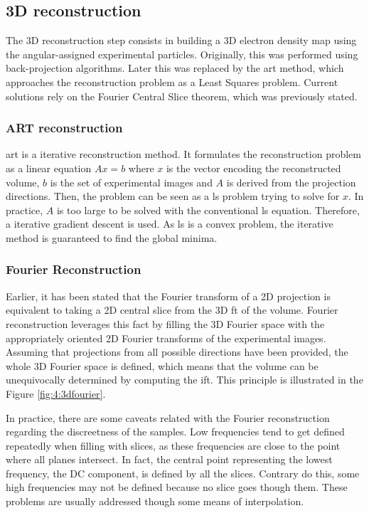 \documentclass[../main.tex]{subfiles}
\begin{document}
\subsection{3D reconstruction}
The 3D reconstruction step consists in building a 3D electron density map using the angular-assigned experimental particles. Originally, this was performed using back-projection algorithms. Later this was replaced by the \gls{art} method, which approaches the reconstruction problem as a Least Squares problem. Current solutions rely on the Fourier Central Slice theorem, which was previously stated.

\subsubsection{ART reconstruction}
\Gls{art} is a iterative reconstruction method. It formulates the reconstruction problem as a linear equation $Ax = b$ where $x$ is the vector encoding the reconstructed volume, $b$ is the set of experimental images and $A$ is derived from the projection directions. Then, the problem can be seen as a \gls{ls} problem\cite{kak2001} trying to solve for $x$. In practice, $A$ is too large to be solved with the conventional \gls{ls} equation. Therefore, a iterative gradient descent is used. As \gls{ls} is a convex problem, the iterative method is guaranteed to find the global minima\cite{nikazad2008}\cite{sorzano2017b}.

\subsubsection{Fourier Reconstruction}
Earlier, it has been stated that the Fourier transform of a 2D projection is equivalent to taking a 2D central slice from the 3D \gls{ft} of the volume. Fourier reconstruction leverages this fact by filling the 3D Fourier space with the appropriately oriented 2D Fourier transforms of the experimental images. Assuming that projections from all possible directions have been provided, the whole 3D Fourier space is defined, which means that the volume can be unequivocally determined by computing the \gls{ift}. This principle is illustrated in the Figure \ref{fig:4:3dfourier}\cite{sorzano2017b}.

In practice, there are some caveats related with the Fourier reconstruction regarding the discreetness of the samples. Low frequencies tend to get defined repeatedly when filling with slices, as these frequencies are close to the point where all planes intersect. In fact, the central point representing the lowest frequency, the DC component, is defined by all the slices. Contrary do this, some high frequencies may not be defined because no slice goes though them. These problems are usually addressed though some means of interpolation.
\end{document}
